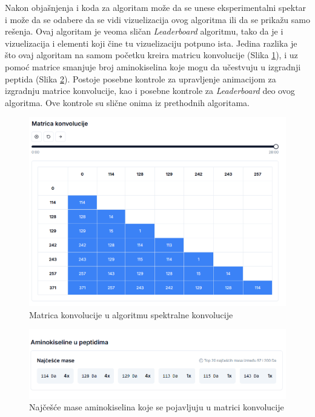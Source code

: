 \documentclass[12pt,oneside]{memoir}
\begin{document}
Nakon objašnjenja i koda za algoritam može da se unese eksperimentalni spektar i može da se odabere da se vidi vizuelizacija ovog algoritma ili da se prikažu samo rešenja. Ovaj algoritam je veoma sličan \emph{Leaderboard} algoritmu, tako da je i vizuelizacija i elementi koji čine tu vizuelizaciju potpuno ista. Jedina razlika je što ovaj algoritam na samom početku kreira matricu konvolucije (Slika \ref{fig:convolution_2}), i uz pomoć matrice smanjuje broj aminokiselina koje mogu da učestvuju u izgradnji peptida (Slika \ref{fig:convolution_3}). Postoje posebne kontrole za upravljenje animacijom za izgradnju matrice konvolucije, kao i posebne kontrole za \emph{Leaderboard} deo ovog algoritma. Ove kontrole su slične onima iz prethodnih algoritama.

\begin{figure}[H]
\centering
\includegraphics[width=1\textwidth]{images/convolution_2.png}
\caption{Matrica konvolucije u algoritmu spektralne konvolucije}
\label{fig:convolution_2}
\end{figure}

\begin{figure}[H]
\centering
\includegraphics[width=1\textwidth]{images/convolution_3.png}
\caption{Najčešće mase aminokiselina koje se pojavljuju u matrici konvolucije}
\label{fig:convolution_3}
\end{figure}
\end{document}
